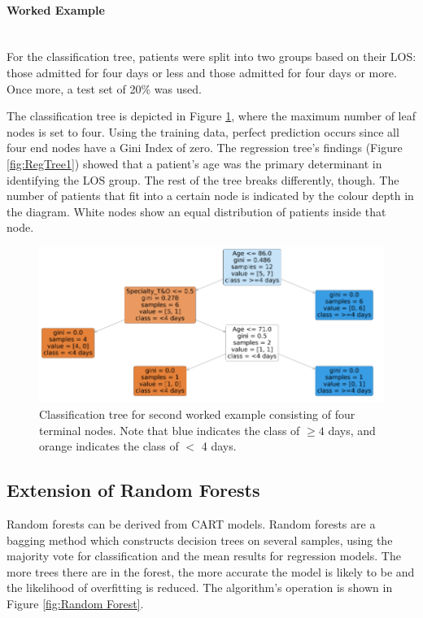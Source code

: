 \documentclass[../thesis.tex]{subfiles}
\begin{document}
\paragraph{Worked Example}\\
For the classification tree, patients were split into two groups based on their LOS: those admitted for four days or less and those admitted for four days or more. Once more, a test set of 20\% was used.

The classification tree is depicted in Figure \ref{fig:classificationtreeExample}, where the maximum number of leaf nodes is set to four. Using the training data, perfect prediction occurs since all four end nodes have a Gini Index of zero. The regression tree's findings (Figure \ref{fig:RegTree1}) showed that a patient's age was the primary determinant in identifying the LOS group. The rest of the tree breaks differently, though. The number of patients that fit into a certain node is indicated by the colour depth in the diagram. White nodes show an equal distribution of patients inside that node.

\begin{figure}[h!]
    \centering
    \includegraphics[scale = 0.8]{Chapters/Chapter3/Figures/classificationtreeexample.png}
    \caption{Classification tree for second worked example consisting of four terminal nodes. Note that blue indicates the class of $\geq 4$ days, and orange indicates the class of $<$ 4 days.}
    \label{fig:classificationtreeExample}
\end{figure}

\subsection{Extension of Random Forests}\label{sec:randomforest}
Random forests can be derived from CART models. Random forests are a bagging method which constructs decision trees on several samples, using the majority vote for classification and the mean results for regression models. The more trees there are in the forest, the more accurate the model is likely to be and the likelihood of overfitting is reduced. The algorithm's operation is shown in Figure \ref{fig:Random Forest}.
\end{document}
